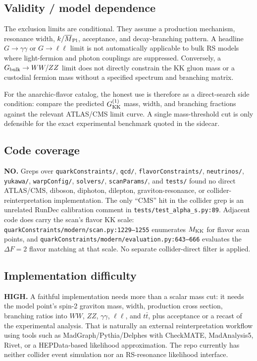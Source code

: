 \subsection*{Validity / model dependence}
The exclusion limits are conditional.  They assume a production mechanism,
resonance width, \(k/\overline{M}_{\rm Pl}\), acceptance, and decay-branching
pattern.  A headline \(G\to\gamma\gamma\) or \(G\to\ell\ell\) limit is not
automatically applicable to bulk RS models where light-fermion and photon
couplings are suppressed.  Conversely, a \(G_{\rm bulk}\to WW/ZZ\) limit does
not directly constrain the KK gluon mass or a custodial fermion mass without a
specified spectrum and branching matrix.

For the anarchic-flavor catalog, the honest use is therefore as a direct-search
side condition: compare the predicted \(G^{(1)}_{\rm KK}\) mass, width, and
branching fractions against the relevant ATLAS/CMS limit curve.  A single
mass-threshold cut is only defensible for the exact experimental benchmark
quoted in the sidecar.

\subsection*{Code coverage}
\textbf{NO.}  Greps over \texttt{quarkConstraints/}, \texttt{qcd/},
\texttt{flavorConstraints/}, \texttt{neutrinos/}, \texttt{yukawa/},
\texttt{warpConfig/}, \texttt{solvers/}, \texttt{scanParams/}, and
\texttt{tests/} found no direct ATLAS/CMS, diboson, diphoton, dilepton,
graviton-resonance, or collider-reinterpretation implementation.  The only
``CMS'' hit in the collider grep is an unrelated RunDec calibration comment in
\texttt{tests/test\_alpha\_s.py:89}.  Adjacent code does carry the scan's
flavor KK scale: \texttt{quarkConstraints/modern/scan.py:1229--1255}
enumerates \(M_{\rm KK}\) for flavor scan points, and
\texttt{quarkConstraints/modern/evaluation.py:643--666} evaluates the
\(\Delta F=2\) flavor matching at that scale.  No separate collider-direct
filter is applied.

\subsection*{Implementation difficulty}
\textbf{HIGH.}  A faithful implementation needs more than a scalar mass cut:
it needs the model point's spin-2 graviton mass, width, production cross
section, branching ratios into \(WW\), \(ZZ\), \(\gamma\gamma\), \(\ell\ell\),
and \(t\bar t\), plus acceptance or a recast of the experimental analysis.
That is naturally an external reinterpretation workflow using tools such as
MadGraph/Pythia/Delphes with CheckMATE, MadAnalysis5, Rivet, or a HEPData-based
likelihood approximation.  The repo currently has neither collider event
simulation nor an RS-resonance likelihood interface.


